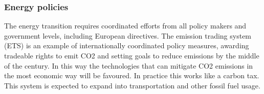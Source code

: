 \documentclass[../summary.tex]{subfiles}
\begin{document}
\subsubsection{Energy policies}

The energy transition requires coordinated efforts from all policy makers and government levels, including European directives. The emission trading system (ETS) is an example of internationally coordinated policy measures, awarding tradeable rights to emit CO2 and setting goals to reduce emissions by the middle of the century. In this way the technologies that can mitigate CO2 emissions in the most economic way will be favoured. In practice this works like a carbon tax. This system is expected to expand into transportation and other fossil fuel usage.
\end{document}
